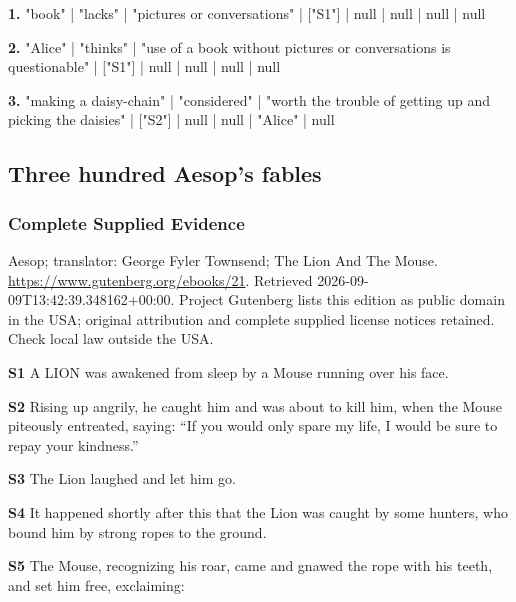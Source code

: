 \noindent\textbf{1.} "book" | "lacks" | "pictures or conversations" | ["S1"] | null | null | null | null\par\smallskip

\noindent\textbf{2.} "Alice" | "thinks" | "use of a book without pictures or conversations is questionable" | ["S1"] | null | null | null | null\par\smallskip

\noindent\textbf{3.} "making a daisy-chain" | "considered" | "worth the trouble of getting up and picking the daisies" | ["S2"] | null | null | "Alice" | null\par\smallskip

\clearpage\subsection*{Three hundred Aesop's fables}

\subsubsection*{Complete Supplied Evidence}

Aesop; translator: George Fyler Townsend; The Lion And The Mouse. \url{https://www.gutenberg.org/ebooks/21}. Retrieved 2026-09-09T13:42:39.348162+00:00. Project Gutenberg lists this edition as public domain in the USA; original attribution and complete supplied license notices retained. Check local law outside the USA.

\noindent\textbf{S1} A LION was awakened from sleep by a Mouse running over his face.\par\smallskip

\noindent\textbf{S2}  Rising
up angrily, he caught him and was about to kill him, when the Mouse
piteously entreated, saying: ``If you would only spare my life, I would
be sure to repay your kindness.''\par\smallskip

\noindent\textbf{S3}  The Lion laughed and let him go.\par\smallskip

\noindent\textbf{S4}  It
happened shortly after this that the Lion was caught by some hunters,
who bound him by strong ropes to the ground.\par\smallskip

\noindent\textbf{S5}  The Mouse, recognizing his
roar, came and gnawed the rope with his teeth, and set him free,
exclaiming:\par\smallskip

